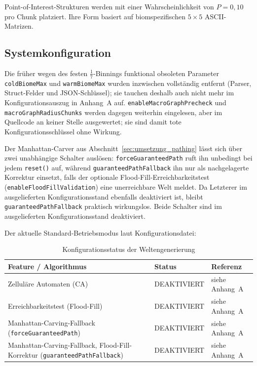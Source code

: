 \documentclass[
  a4paper,
  11pt,
  twoside,
  BCOR=8mm,           %
  headings=big,
  numbers=noenddot,
  listof=totoc,       %
  captions=tableheading,
]{scrreprt}
\begin{document}
Point-of-Interest-Strukturen werden mit einer Wahrscheinlichkeit von $P = 0,10$ pro Chunk platziert. Ihre Form basiert auf biomspezifischen $5 \times 5$ ASCII-Matrizen.

\subsection{Systemkonfiguration}
\label{sec:konfiguration}

Die früher wegen des festen $\frac{1}{7}$-Binnings funktional obsoleten Parameter \texttt{coldBiomeMax} und \texttt{warmBiomeMax} wurden inzwischen vollständig entfernt (Parser, Struct-Felder und JSON-Schlüssel); sie tauchen deshalb auch nicht mehr im Konfigurationsauszug in Anhang~A auf. \texttt{enableMacroGraphPrecheck} und \texttt{macroGraphRadiusChunks} werden dagegen weiterhin eingelesen, aber im Quellcode an keiner Stelle ausgewertet; sie sind damit tote Konfigurationsschlüssel ohne Wirkung.

Der Manhattan-Carver aus Abschnitt~\ref{sec:umsetzung_pathing} lässt sich über zwei unabhängige Schalter auslösen: \texttt{forceGuaranteedPath} ruft ihn unbedingt bei jedem \texttt{reset()} auf, während \texttt{guaranteedPathFallback} ihn nur als nachgelagerte Korrektur einsetzt, falls der optionale Flood-Fill-Erreichbarkeitstest (\texttt{enableFloodFillValidation}) eine unerreichbare Welt meldet. Da Letzterer im ausgelieferten Konfigurationsstand ebenfalls deaktiviert ist, bleibt \texttt{guaranteedPathFallback} praktisch wirkungslos. Beide Schalter sind im ausgelieferten Konfigurationsstand deaktiviert.

Der aktuelle Standard-Betriebsmodus laut Konfigurationsdatei:

\begin{table}[h!]
\centering
\caption{Konfigurationsstatus der Weltengenerierung}
\label{tab:config_status}
\small
\begin{tabular}{|p{7.6cm}|p{2.4cm}|p{2.6cm}|}
\hline
\textbf{Feature / Algorithmus} & \textbf{Status} & \textbf{Referenz} \\ \hline
Zelluläre Automaten (CA) & DEAKTIVIERT & siehe Anhang~A \\ \hline
Erreichbarkeitstest (Flood-Fill) & DEAKTIVIERT & siehe Anhang~A \\ \hline
Manhattan-Carving-Fallback (\texttt{forceGuaranteedPath}) & DEAKTIVIERT & siehe Anhang~A \\ \hline
Manhattan-Carving-Fallback, Flood-Fill-Korrektur (\texttt{guaranteedPathFallback}) & DEAKTIVIERT & siehe Anhang~A \\ \hline
\end{tabular}
\end{table}
\end{document}
